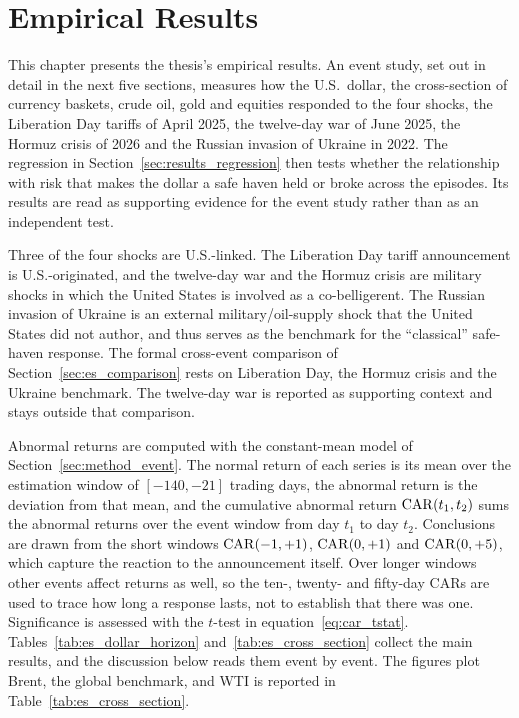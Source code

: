 %

\chapter{Empirical Results}
\label{ch:results}

This chapter presents the thesis's empirical results. An event study, set out in detail in the next five sections, measures how the U.S.\ dollar, the cross-section of currency baskets, crude oil, gold and equities responded to the four shocks, the Liberation Day tariffs of April 2025, the twelve-day war of June 2025, the Hormuz crisis of 2026 and the Russian invasion of Ukraine in 2022. The regression in Section~\ref{sec:results_regression} then tests whether the relationship with risk that makes the dollar a safe haven held or broke across the episodes. Its results are read as supporting evidence for the event study rather than as an independent test.

Three of the four shocks are U.S.-linked. The Liberation Day tariff announcement is U.S.-originated, and the twelve-day war and the Hormuz crisis are military shocks in which the United States is involved as a co-belligerent. The Russian invasion of Ukraine is an external military/oil-supply shock that the United States did not author, and thus serves as the benchmark for the ``classical'' safe-haven response. The formal cross-event comparison of Section~\ref{sec:es_comparison} rests on Liberation Day, the Hormuz crisis and the Ukraine benchmark. The twelve-day war is reported as supporting context and stays outside that comparison.

Abnormal returns are computed with the constant-mean model of Section~\ref{sec:method_event}. The normal return of each series is its mean over the estimation window of $[-140,-21]$ trading days, the abnormal return is the deviation from that mean, and the cumulative abnormal return $\mathrm{CAR}(t_1,t_2)$ sums the abnormal returns over the event window from day $t_1$ to day $t_2$. Conclusions are drawn from the short windows $\mathrm{CAR}(-1,+1)$, $\mathrm{CAR}(0,+1)$ and $\mathrm{CAR}(0,+5)$, which capture the reaction to the announcement itself. Over longer windows other events affect returns as well, so the ten-, twenty- and fifty-day CARs are used to trace how long a response lasts, not to establish that there was one.
Significance is assessed with the $t$-test in equation~\eqref{eq:car_tstat}. Tables~\ref{tab:es_dollar_horizon} and~\ref{tab:es_cross_section} collect the main results, and the discussion below reads them event by event. The figures plot Brent, the global benchmark, and WTI is reported in Table~\ref{tab:es_cross_section}.


